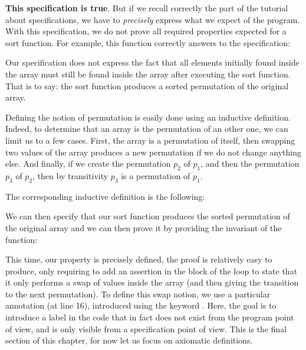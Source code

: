 

\textbf{This specification is true}. But if we recall correctly the part of the
tutorial about specifications, we have to \emph{precisely} express what we expect
of the program. With this specification, we do not prove all required properties
expected for a sort function. For example, this function correctly answers to
the specification:




Our specification does not express the fact that all elements initially found
inside the array must still be found inside the array after executing the
sort function. That is to say: the sort function produces a sorted permutation
of the original array.

Defining the notion of permutation is easily done using an inductive definition.
Indeed, to determine that an array is the permutation of an other one, we can
limit us to a few cases. First, the array is a permutation of itself, then
swapping two values of the array produces a new permutation if we do not change
anything else. And finally, if we create the permutation $p_2$ of $p_1$, and then
the permutation $p_3$ of $p_2$, then by transitivity $p_3$ is a permutation of
$p_1$.

The corresponding inductive definition is the following:




We can then specify that our sort function produces the sorted permutation of
the original array and we can then prove it by providing the invariant of the
function:





This time, our property is precisely defined, the proof is relatively easy to
produce, only requiring to add an assertion in the block of the loop to state
that it only performs a swap of values inside the array (and then giving
the transition to the next permutation). To define this swap notion, we use
a particular annotation (at line 16), introduced using the keyword
. Here, the goal is to introduce a label in the code that in
fact does not exist from the program point of view, and is only visible from
a specification point of view. This is the final section of this chapter, for
now let us focus on axiomatic definitions.
